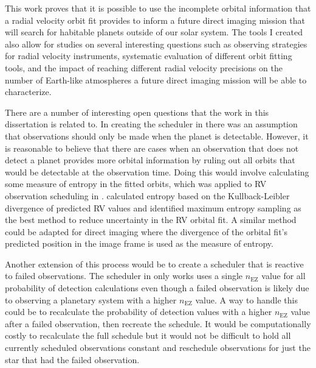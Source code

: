 This work proves that it is possible to use the incomplete orbital information
that a radial velocity orbit fit provides to inform a future direct imaging
mission that will search for habitable planets outside of our solar system. The
tools I created also allow for studies on several interesting questions
such as observing strategies for radial velocity instruments, systematic
evaluation of different orbit fitting tools, and the impact of reaching
different radial velocity precisions on the number of Earth-like atmospheres a
future direct imaging mission will be able to characterize.

There are a number of interesting open questions that the work in this
dissertation is related to. In creating the scheduler in
 there was an assumption that observations should
only be made when the planet is detectable. However, it is reasonable to
believe that there are cases when an observation that does not detect a planet
provides more orbital information by ruling out all orbits that would be
detectable at the observation time. Doing this would involve calculating some
measure of entropy in the fitted orbits, which was applied to RV observation
scheduling in \citet{loredoBayesianMethodsAnalysis2012}.
\citet{loredoBayesianMethodsAnalysis2012} calculated entropy based on the
Kullback-Leibler divergence of predicted RV values and identified maximum
entropy sampling as the best method to reduce uncertainty in the RV orbital
fit. A similar method could be adapted for direct imaging where the divergence
of the orbital fit's predicted position in the image frame is used as the
measure of entropy.

Another extension of this process would be to create a scheduler that is
reactive to failed observations. The scheduler in 
only works uses a single $n_\textrm{EZ}$ value for all probability of detection
calculations even though a failed observation is likely due to observing a
planetary system with a higher $n_\textrm{EZ}$ value. A way to handle this
could be to recalculate the probability of detection values with a higher
$n_\textrm{EZ}$ value after a failed observation, then recreate the schedule.
It would be computationally costly to recalculate the full schedule but it
would not be difficult to hold all currently scheduled observations constant
and reschedule observations for just the star that had the failed observation.

